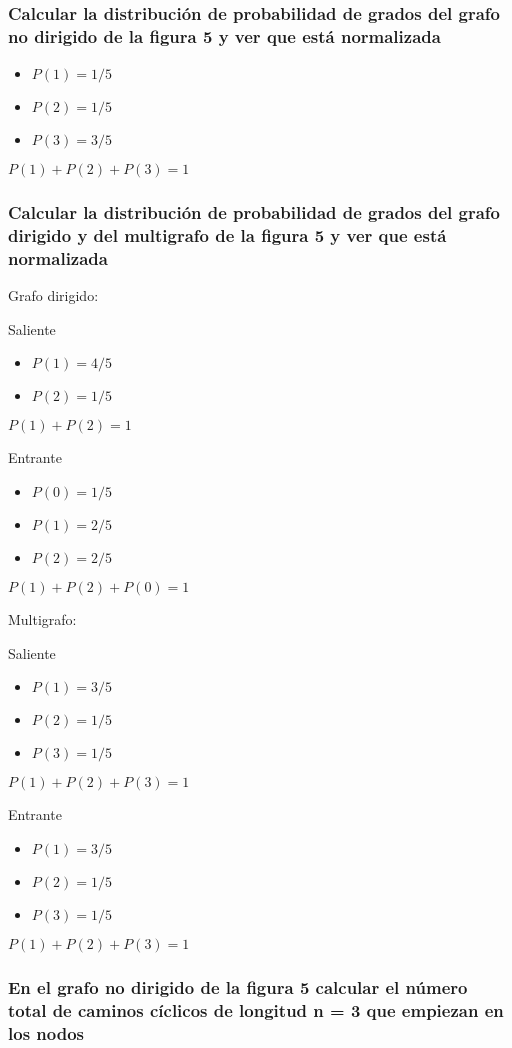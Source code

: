 \subsubsection{\large Calcular la distribución de probabilidad de grados del grafo no dirigido de la figura 5 y ver que está normalizada}
\begin{itemize}
\item $P(1)=1/5$
\item$P(2)=1/5$
\item $P(3)=3/5$
\end{itemize}
$P(1)+P(2)+P(3)=1$


\subsubsection{\large Calcular la distribución de probabilidad de grados del grafo dirigido y del multigrafo de la figura 5 y ver que está normalizada}
Grafo dirigido:

Saliente
\begin{itemize}
	\item $P(1)=4/5$
	\item$P(2)=1/5$

\end{itemize}
$P(1)+P(2)=1$

Entrante
\begin{itemize}
	\item $P(0)=1/5$
	\item$P(1)=2/5$
	\item $P(2)=2/5$

\end{itemize}
$P(1)+P(2)+P(0)=1$


Multigrafo:

Saliente
\begin{itemize}
	\item $P(1)=3/5$
	\item$P(2)=1/5$
	\item$P(3)=1/5$
\end{itemize}
$P(1)+P(2)+P(3)=1$

Entrante
\begin{itemize}
	\item $P(1)=3/5$
	\item$P(2)=1/5$
	\item $P(3)=1/5$
	
\end{itemize}
$P(1)+P(2)+P(3)=1$

\subsubsection{\large En el grafo no dirigido de la figura 5 calcular el número total de caminos cíclicos de longitud n = 3 que empiezan en los nodos }

